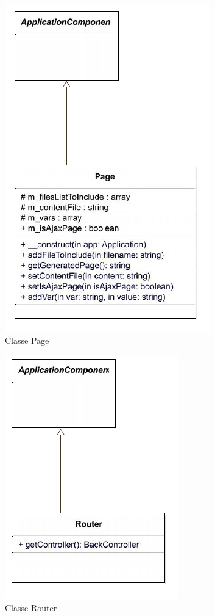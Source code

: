     \begin{figure}[h]
        \begin{center}
            \includegraphics[scale=1.0]{images/uml/classes/Page.png} 
        \end{center}

        \caption{Classe Page}
        \label{Classe Page}
    \end{figure}


    \begin{figure}[h]
        \begin{center}
            \includegraphics[scale=1.0]{images/uml/classes/Router.png} 
        \end{center}

        \caption{Classe Router}
        \label{Classe Router}
    \end{figure}


